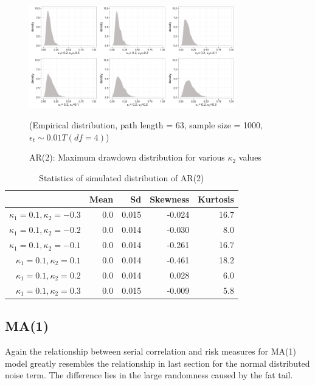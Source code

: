 \documentclass[11pt]{article}
\begin{document}
\begin{figure}[H]
\centering
\includegraphics[width = 0.8\textwidth]{../figures/simulation/T_dist_AR2_maxDrawdown_dist_kappa1_02}
\caption{AR(2): Maximum drawdown distribution for various $\kappa_2$ values }
(Empirical distribution, path length = 63, sample size = 1000, $\epsilon_t \sim 0.01T(df = 4)$)
\label{fig:T_dist_AR2_maxDrawdown_dist_kappa1_02}
\end{figure}

\begin{table}[H]
\centering
\begin{tabular}{|r |r r r r|}
\hline
& Mean & Sd & Skewness & Kurtosis \\
\hline
$\kappa_1 = 0.1, \kappa_2 = -0.3$ & 0.0 & 0.015 & -0.024 & 16.7\\
$\kappa_1 = 0.1, \kappa_2 = -0.2$ & 0.0 & 0.014 & -0.030 & 8.0\\
$\kappa_1 = 0.1, \kappa_2 = -0.1$ & 0.0 & 0.014 & -0.261 & 16.7\\
$\kappa_1 = 0.1, \kappa_2 = 0.1$ & 0.0 & 0.014 & -0.461 & 18.2\\
$\kappa_1 = 0.1, \kappa_2 = 0.2$ & 0.0 & 0.014 & 0.028 & 6.0\\
$\kappa_1 = 0.1, \kappa_2 = 0.3$ & 0.0 & 0.015 & -0.009 & 5.8\\
\hline
\end{tabular}
\caption{Statistics of simulated distribution of AR(2)}
\label{table: T_dist_AR2_return}
\end{table}

\subsection{MA(1)}

Again the relationship between serial correlation and risk measures for MA(1) model greatly resembles the relationship in last section for the normal distributed noise term. The difference lies in the large randomness caused by the fat tail. 
\end{document}
